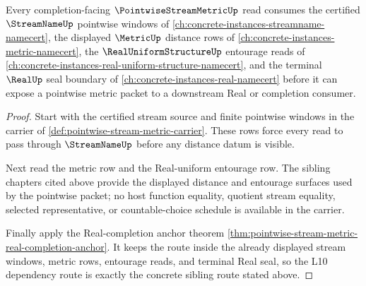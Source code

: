 \begin{theorem}
\label{thm:pointwise-stream-metric-l10-route}
Every completion-facing $\PointwiseStreamMetricUp$ read consumes the certified $\StreamNameUp$ pointwise windows of \autoref{ch:concrete-instances-streamname-namecert}, the displayed $\MetricUp$ distance rows of \autoref{ch:concrete-instances-metric-namecert}, the $\RealUniformStructureUp$ entourage reads of \autoref{ch:concrete-instances-real-uniform-structure-namecert}, and the terminal $\RealUp$ seal boundary of \autoref{ch:concrete-instances-real-namecert} before it can expose a pointwise metric packet to a downstream Real or completion consumer.
\end{theorem}
\begin{proof}
Start with the certified stream source and finite pointwise windows in the carrier of \autoref{def:pointwise-stream-metric-carrier}. These rows force every read to pass through $\StreamNameUp$ before any distance datum is visible.

Next read the metric row and the Real-uniform entourage row. The sibling chapters cited above provide the displayed distance and entourage surfaces used by the pointwise packet; no host function equality, quotient stream equality, selected representative, or countable-choice schedule is available in the carrier.

Finally apply the Real-completion anchor theorem \autoref{thm:pointwise-stream-metric-real-completion-anchor}. It keeps the route inside the already displayed stream windows, metric rows, entourage reads, and terminal Real seal, so the L10 dependency route is exactly the concrete sibling route stated above.
\end{proof}
